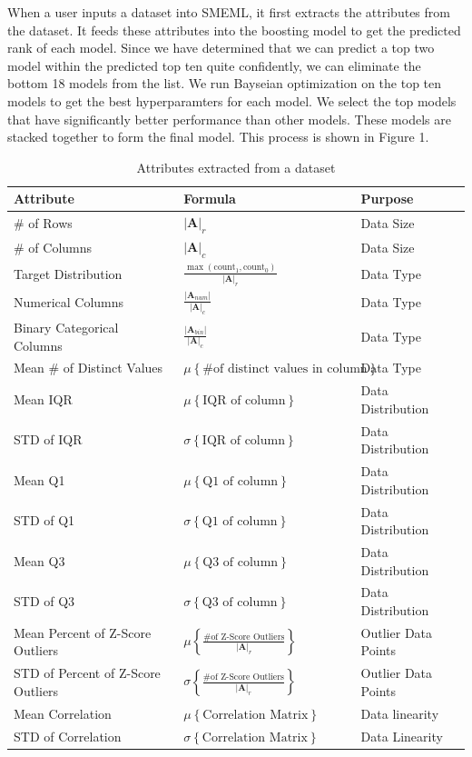 \documentclass{article}
\begin{document}
When a user inputs a dataset into SMEML, it first extracts the attributes from the dataset. It feeds these attributes into the boosting model to get the predicted rank of each model. Since we have determined that we can predict a top two model within the predicted top ten quite confidently, we can eliminate the bottom 18 models from the list. We run Bayseian optimization on the top ten models to get the best hyperparamters for each model. We select the top models that have significantly better performance than other models. These models are stacked together to form the final model. This process is shown in Figure 1.
\begin{table}
  \caption{Attributes extracted from a dataset}
  \label{model-options-table}
  \centering
  \begin{tabular}{lll}
    \toprule
    Attribute & Formula & Purpose\\
    \midrule
    \# of Rows & $|\mathbf{A}|_r$ & Data Size \\
    \hline
    \# of Columns & $|\mathbf{A}|_c$ & Data Size \\
    \hline
    Target Distribution &
    $\frac{\max(\text{count}_1, \text{count}_0)}{|\mathbf{A}|_r}$
    & Data Type \\
    \hline
    Numerical Columns &
    $\frac{|\mathbf{A}_{num}|}{|\mathbf{A}|_{c}}$
    & Data Type \\
    \hline
    Binary Categorical Columns &
    $\frac{|\mathbf{A}_{bin}|}{|\mathbf{A}|_{c}}$
    & Data Type \\
    \hline
    Mean \# of Distinct Values  & $\mu \left\{\text{\# of distinct values in column}\right\}$ & Data Type \\ 
    \hline
    Mean IQR  & $\mu \left\{\text{IQR of column}\right\}$ & Data Distribution \\ 
    \hline
    STD of IQR  & $\sigma \left\{\text{IQR of column}\right\}$ & Data Distribution \\
    \hline
    Mean Q1 & $\mu \left\{\text{Q1 of column}\right\}$ & Data Distribution \\
    \hline
    STD of Q1  & $\sigma \left\{\text{Q1 of column}\right\}$ & Data Distribution \\
    \hline
    Mean Q3  & $\mu \left\{\text{Q3 of column}\right\}$ & Data Distribution \\
    \hline
    STD of Q3  & $\sigma \left\{\text{Q3 of column}\right\}$ & Data Distribution \\
    \hline
    Mean Percent of Z-Score Outliers  & 
    $\mu \left\{ \frac{\text{\# of Z-Score Outliers}}{|\mathbf{A}|_r} \right\}$ & Outlier Data Points \\
    \hline
    STD of Percent of Z-Score Outliers  &
    $\sigma \left\{ \frac{\text{\# of Z-Score Outliers}}{|\mathbf{A}|_r} \right\}$ & Outlier Data Points \\
    \hline
    Mean Correlation& $\mu \left\{\text{Correlation Matrix}\right\}$ & Data linearity \\
    \hline
    STD of Correlation & $\sigma \left\{\text{Correlation Matrix}\right\}$ & Data Linearity \\
    \bottomrule
  \end{tabular}
\end{table}
\end{document}
